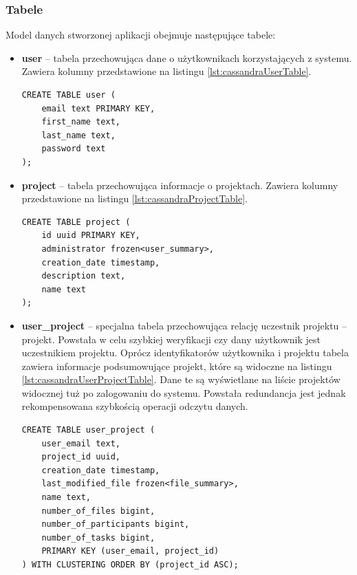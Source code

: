 \subsubsection{Tabele}

Model danych stworzonej aplikacji obejmuje następujące tabele:
\begin{itemize}
    \item \textbf{user} -- tabela przechowująca dane o użytkownikach korzystających z systemu.
    Zawiera kolumny przedstawione na listingu \ref{lst:cassandraUserTable}.

    \begin{minipage}{\linewidth}
    \begin{lstlisting}[language=CQL,caption={Definicja tabeli \textit{user}},label={lst:cassandraUserTable}]
CREATE TABLE user (
    email text PRIMARY KEY,
    first_name text,
    last_name text,
    password text
);
    \end{lstlisting}
    \end{minipage}

    \item \textbf{project} -- tabela przechowująca informacje o projektach.
    Zawiera kolumny przedstawione na listingu \ref{lst:cassandraProjectTable}.
    
    \begin{minipage}{\linewidth}
    \begin{lstlisting}[language=CQL,caption={Definicja tabeli \textit{project}},label={lst:cassandraProjectTable}]
CREATE TABLE project (
    id uuid PRIMARY KEY,
    administrator frozen<user_summary>,
    creation_date timestamp,
    description text,
    name text
);
    \end{lstlisting}
    \end{minipage}
    
    \item \textbf{user\_project} -- specjalna tabela przechowująca relację uczestnik projektu -- projekt. 
    Powstała w celu szybkiej weryfikacji czy dany użytkownik jest uczestnikiem projektu.
    Oprócz identyfikatorów użytkownika i projektu tabela zawiera informacje podsumowujące projekt, które są widoczne na listingu \ref{lst:cassandraUserProjectTable}. 
    Dane te są wyświetlane na liście projektów widocznej tuż po zalogowaniu do systemu.
    Powstała redundancja jest jednak rekompensowana szybkością operacji odczytu danych.
    
    \begin{minipage}{\linewidth}
    \begin{lstlisting}[language=CQL,caption={Definicja tabeli \textit{user\_project}},label={lst:cassandraUserProjectTable}]
CREATE TABLE user_project (
    user_email text,
    project_id uuid,
    creation_date timestamp,
    last_modified_file frozen<file_summary>,
    name text,
    number_of_files bigint,
    number_of_participants bigint,
    number_of_tasks bigint,
    PRIMARY KEY (user_email, project_id)
) WITH CLUSTERING ORDER BY (project_id ASC);
    \end{lstlisting}
    \end{minipage}
    

\end{itemize}
